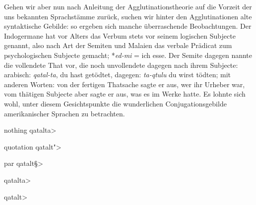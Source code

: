 
Gehen wir aber nun nach Anleitung der Agglutinationstheorie auf die Vorzeit der uns bekannten Sprachstämme zurück, suchen wir hinter den Agglutinationen alte syntaktische Gebilde: so ergeben sich manche überraschende Beobachtungen. Der Indogermane hat vor Alters das Verbum stets vor seinem logischen Subjecte genannt, also nach Art der Semiten und Malaien das verbale Prädicat zum psychologischen Subjecte gemacht; *\textit{ed-mi} = ich esse. Der Semite dagegen nannte die vollendete That vor, 
die noch unvollendete dagegen nach ihrem Subjecte: arabisch:
\textit{qatal-ta}, du hast getödtet, 
dagegen:  \textit{ta-qtulu} du wirst tödten; mit anderen Worten: von der fertigen Thatsache sagte er aus, \label{fp.357} wer ihr Urheber war, vom thätigen Subjecte aber sagte er aus, was es im Werke hatte.  Es lohnte sich wohl, unter diesem Gesichtspunkte die wunderlichen Conjugationsgebilde amerikanischer Sprachen zu betrachten.




% 
% 
% 

nothing {\<\setarab  qatalta>}

quotation {\<\setarab  qatalt">}

par {\<\setarab  qatalt§>}

\<\setarab  qatalta>  


\<\setarab  qatalt>  

% 

